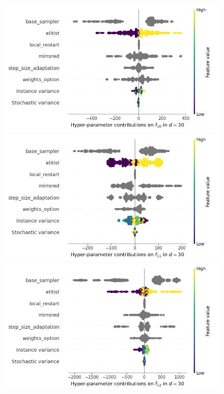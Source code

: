 \begin{figure}[t]
	\includegraphics[height=0.15\textheight,trim=60mm 0mm 30mm 0mm,clip]{images/img_summary_f10_d30.png}
	\includegraphics[height=0.15\textheight,trim=60mm 0mm 30mm 0mm,clip]{images/img_summary_f11_d30.png}
	\includegraphics[height=0.15\textheight,trim=60mm 0mm 0mm 0mm,clip]{images/img_summary_f12_d30.png}

\end{figure}
